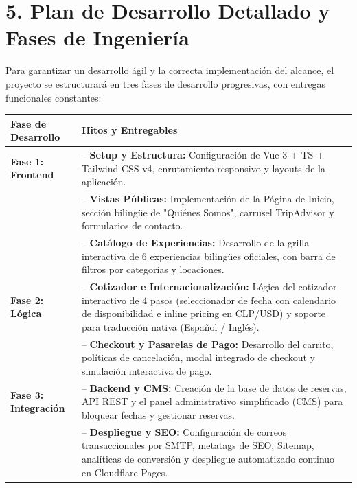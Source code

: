 \documentclass[11pt,a4paper]{article}
\begin{document}
\newpage

\section{5. Plan de Desarrollo Detallado y Fases de Ingeniería}

Para garantizar un desarrollo ágil y la correcta implementación del alcance, el proyecto se estructurará en tres fases de desarrollo progresivas, con entregas funcionales constantes:

\begin{table}[h!]
    \centering
    \renewcommand{\arraystretch}{1.3}
    \begin{tabularx}{\textwidth}{|l|X|}
    \hline
    \textbf{Fase de Desarrollo} & \textbf{Hitos y Entregables} \\
    \hline
    \textbf{Fase 1: Frontend} & 
    -- \textbf{Setup y Estructura:} Configuración de Vue 3 + TS + Tailwind CSS v4, enrutamiento responsivo y layouts de la aplicación.\\
    & -- \textbf{Vistas Públicas:} Implementación de la Página de Inicio, sección bilingüe de "Quiénes Somos", carrusel TripAdvisor y formularios de contacto.\\
    & -- \textbf{Catálogo de Experiencias:} Desarrollo de la grilla interactiva de 6 experiencias bilingües oficiales, con barra de filtros por categorías y locaciones. \\
    \hline
    \textbf{Fase 2: Lógica} & 
    -- \textbf{Cotizador e Internacionalización:} Lógica del cotizador interactivo de 4 pasos (seleccionador de fecha con calendario de disponibilidad e inline pricing en CLP/USD) y soporte para traducción nativa (Español / Inglés).\\
    & -- \textbf{Checkout y Pasarelas de Pago:} Desarrollo del carrito, políticas de cancelación, modal integrado de checkout y simulación interactiva de pago. \\
    \hline
    \textbf{Fase 3: Integración} & 
    -- \textbf{Backend y CMS:} Creación de la base de datos de reservas, API REST y el panel administrativo simplificado (CMS) para bloquear fechas y gestionar reservas.\\
    & -- \textbf{Despliegue y SEO:} Configuración de correos transaccionales por SMTP, metatags de SEO, Sitemap, analíticas de conversión y despliegue automatizado continuo en Cloudflare Pages. \\
    \hline
    \end{tabularx}
\end{table}
\end{document}
